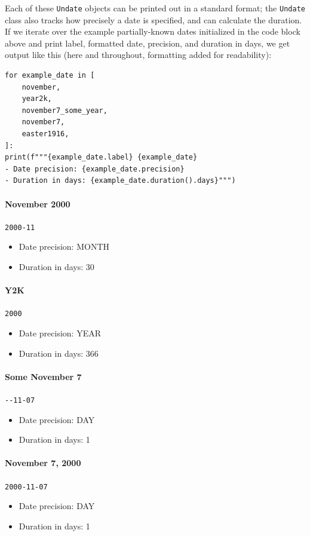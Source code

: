 \documentclass{anthology-ch}         %
\begin{document}
Each of these \texttt{Undate} objects can be printed out in a standard
format; the \texttt{Undate} class also tracks how precisely a date is
specified, and can calculate the duration.  If we iterate over the
example partially-known dates initialized in the code block above and print label, formatted date, precision, and duration in days, we get output like this (here and throughout, formatting added for readability):

\begin{verbatim}
for example_date in [
    november,
    year2k,
    november7_some_year,
    november7,
    easter1916,
]:
print(f"""{example_date.label} {example_date}
- Date precision: {example_date.precision}
- Duration in days: {example_date.duration().days}""")
\end{verbatim}

\paragraph{November 2000} \texttt{2000-11}
\begin{itemize}
    \item Date precision: MONTH
    \item Duration in days: 30
\end{itemize}

\paragraph{Y2K} \texttt{2000}
\begin{itemize}
    \item Date precision: YEAR
    \item Duration in days: 366
\end{itemize}

\paragraph{Some November 7} \texttt{-}\texttt{-11-07}
\begin{itemize}
   \item  Date precision: DAY
   \item Duration in days: 1
\end{itemize}

\paragraph{November 7, 2000} \texttt{2000-11-07}
\begin{itemize}
    \item Date precision: DAY
    \item Duration in days: 1
\end{itemize}
\end{document}
